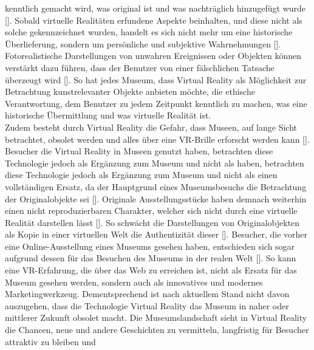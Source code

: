 \documentclass[a4paper,12pt,oneside]{article}
\begin{document}
        kenntlich gemacht wird, was original ist und was nachträglich hinzugefügt
        wurde [\cite[38]{Heidsiek2019}]. Sobald virtuelle Realitäten erfundene Aspekte 
        beinhalten, und diese nicht als solche gekennzeichnet wurden, handelt es sich nicht
        mehr um eine historische Überlieferung, sondern um persönliche und subjektive 
        Wahrnehmungen [\cite[38]{Heidsiek2019}]. Fotorealistische Darstellungen
        von unwahren Ereignissen oder Objekten können verstärkt dazu führen, dass der
        Benutzer von einer fälschlichen Tatsache überzeugt wird [\cite[39]{Heidsiek2019}].
        So hat jedes Museum, dass Virtual Reality als Möglichkeit zur Betrachtung 
        kunstrelevanter Objekte anbieten möchte, die ethische Verantwortung, 
        dem Benutzer zu jedem Zeitpunkt kenntlich zu machen,
        was eine historische Übermittlung und was virtuelle Realität ist. \\
        Zudem besteht durch Virtual Reality die Gefahr, dass Museen, auf lange Sicht 
        betrachtet, obsolet werden und alles über eine VR-Brille erforscht werden kann
        [\cite[142-143]{Huennekens2002}]. Besucher die Virtual Reality in Museen genutzt
        haben, betrachten diese Technologie jedoch als Ergänzung zum Museum und nicht als
        haben, betrachten diese Technologie jedoch als Ergänzung zum Museum und nicht als
        einen vollständigen Ersatz, da der Hauptgrund eines Museumsbesuchs die Betrachtung
        der Originalobjekte sei [\cite[79]{Heidsiek2019}]. Originale Ausstellungsstücke
        haben demnach weiterhin einen nicht reproduzierbaren Charakter, welcher sich nicht 
        durch eine
        virtuelle Realität darstellen lässt [\cite[93]{Heidsiek2019}]. So schwächt die
        Darstellungen von Originalobjekten als Kopie in einer virtuellen Welt
        die Authentizität dieser [\cite[93]{Heidsiek2019}]. 
        Besucher, die vorher eine Online-Ausstellung eines Museums gesehen haben,
        entschieden sich sogar aufgrund dessen für das Besuchen des Museums in der 
        realen Welt [\cite[777-778]{Katz2015}]. So kann eine VR-Erfahrung, die über
        das Web zu erreichen ist, nicht als Ersatz für das Museum gesehen werden,
        sondern auch als innovatives und modernes Marketingwerkzeug.
        Dementsprechend ist nach aktuellem
        Stand nicht davon auszugehen, dass die Technologie Virtual Reality das Museum in
        naher oder mittlerer Zukunft obsolet macht.
        Die Museumslandschaft sieht in Virtual Reality die Chancen, neue und andere
        Geschichten zu vermitteln, langfristig für Besucher attraktiv zu bleiben und
\end{document}
